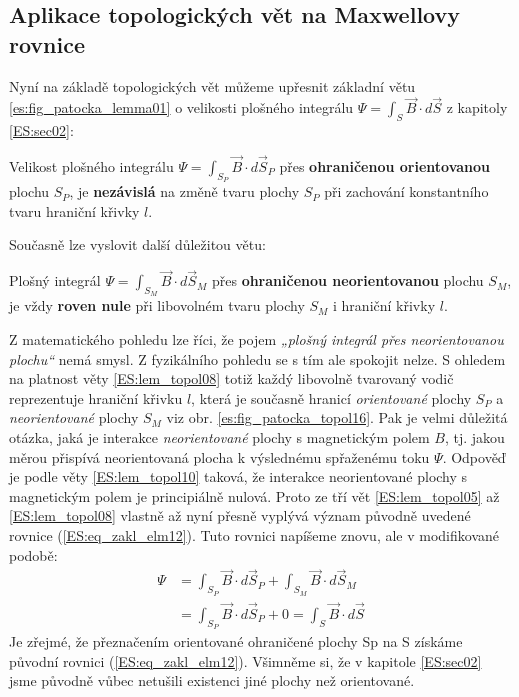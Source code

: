     \subsection{Aplikace topologických vět na Maxwellovy rovnice}\label{teo:IchapIIsecIIsubIV}
      Nyní na základě topologických vět můžeme upřesnit základní větu \ref{es:fig_patocka_lemma01} 
      o velikosti plošného integrálu \(\Psi = \int_S\vec{B}\cdot d\vec{S}\) z kapitoly 
      \ref{ES:sec02}:
      \begin{lemma}\label{ES:lem_topol09}
        Velikost plošného integrálu \(\Psi = \int_{S_P}\vec{B}\cdot d\vec{S}_P\) přes 
        \textbf{ohraničenou orientovanou} plochu \(S_P\), je \textbf{nezávislá} na změně tvaru 
        plochy \(S_P\) při zachování konstantního tvaru hraniční křivky \(l\).        
      \end{lemma}
      Současně lze vyslovit další důležitou větu:
      \begin{lemma}\label{ES:lem_topol10}
        Plošný integrál \(\Psi = \int_{S_M}\vec{B}\cdot d\vec{S}_M\) přes \textbf{ohraničenou 
        neorientovanou} plochu \(S_M\), je vždy \textbf{roven nule} při libovolném tvaru plochy 
        \(S_M\) i hraniční křivky \(l\).        
      \end{lemma}
      
      Z matematického pohledu lze říci, že pojem \emph{„plošný integrál přes neorientovanou 
      plochu“} nemá smysl. Z fyzikálního pohledu se s tím ale spokojit nelze. S ohledem na platnost 
      věty \ref{ES:lem_topol08} totiž každý libovolně tvarovaný vodič reprezentuje hraniční křivku 
      \(l\), která je současně hranicí \emph{orientované} plochy \(S_P\) a \emph{neorientované} 
      plochy \(S_M\) viz obr. \ref{es:fig_patocka_topol16}. Pak je velmi důležitá otázka, jaká je 
      interakce \emph{neorientované} plochy s magnetickým polem \(B\), tj. jakou měrou přispívá 
      neorientovaná plocha k výslednému spřaženému toku \(\Psi\). Odpověď je podle věty 
      \ref{ES:lem_topol10} taková, že interakce neorientované plochy s magnetickým polem je 
      principiálně nulová. Proto ze tří vět \ref{ES:lem_topol05} až \ref{ES:lem_topol08} vlastně až 
      nyní přesně vyplývá význam původně uvedené rovnice (\ref{ES:eq_zakl_elm12}). Tuto rovnici 
      napíšeme znovu, ale v modifikované podobě:
      \begin{align}\label{ES:eq_topol18}
        \Psi &= \int_{S_P}\vec{B}\cdot d\vec{S}_P + \int_{S_M}\vec{B}\cdot d\vec{S}_M \nonumber \\
             &= \int_{S_P}\vec{B}\cdot d\vec{S}_P + 0 
              = \int_{S}\vec{B}\cdot d\vec{S}
      \end{align}
      Je zřejmé, že přeznačením orientované ohraničené plochy Sp na S získáme původní rovnici 
      (\ref{ES:eq_zakl_elm12}). Všimněme si, že v kapitole \ref{ES:sec02} jsme původně vůbec 
      netušili existenci jiné plochy než orientované.
    
